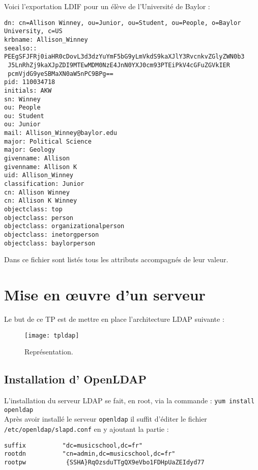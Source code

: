 \documentclass[12pt,a4paper,notitlepage]{article}
\begin{document}
Voici l'exportation LDIF pour un élève de l'Université de Baylor :\\
\begin{lstlisting}[title=Export LDIF d'une entrée élève]
dn: cn=Allison Winney, ou=Junior, ou=Student, ou=People, o=Baylor University, c=US
krbname: Allison_Winney
seealso:: PEEgSFJFRj0iaHR0cDovL3d3dzYuYmF5bG9yLmVkdS9kaXJlY3RvcnkvZGlyZWN0b3
 J5LnRhZj9kaXJpZDI9MTEwMDM0NzE4JnN0YXJ0cm93PTEiPkV4cGFuZGVkIER
 pcmVjdG9yeSBMaXN0aW5nPC9BPg==
pid: 110034718
initials: AKW
sn: Winney
ou: People
ou: Student
ou: Junior
mail: Allison_Winney@baylor.edu
major: Political Science
major: Geology
givenname: Allison
givenname: Allison K
uid: Allison_Winney
classification: Junior
cn: Allison Winney
cn: Allison K Winney
objectclass: top
objectclass: person
objectclass: organizationalperson
objectclass: inetorgperson
objectclass: baylorperson
\end{lstlisting}

Dans ce fichier sont listés tous les attributs accompagnés de leur valeur.

\clearpage
\section{Mise en \oe uvre d'un serveur}

Le but de ce TP est de mettre en place l'architecture LDAP suivante :
\begin{figure}[!h]
\begin{center}
\texttt{[image: tpldap]}
\caption{Représentation.}
\end{center}
\end{figure}


\subsection{Installation d' OpenLDAP}

L'installation du serveur LDAP se fait, en root, via la commande : \texttt{yum install openldap}\\

Après avoir installé le serveur \texttt{openldap} il suffit d'éditer le fichier \texttt{/etc/openldap/slapd.conf} en y ajoutant la partie : 

\begin{lstlisting}[title=Contenu du fichier slapd.conf]
suffix          "dc=musicschool,dc=fr"
rootdn          "cn=admin,dc=musicschool,dc=fr"
rootpw           {SSHA}RqOzsduTTgQX9eVbo1FDHpUaZEIdyd77

\end{lstlisting}
\end{document}

